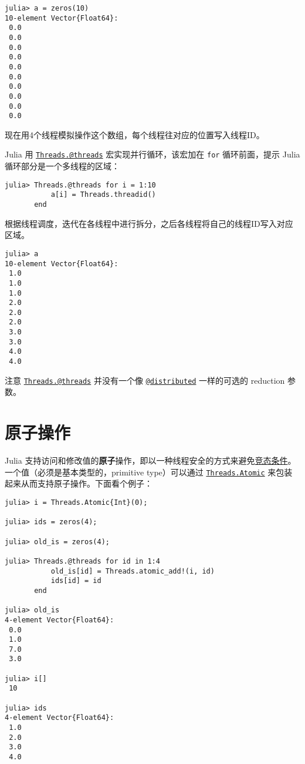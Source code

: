 \begin{verbatim}
julia> a = zeros(10)
10-element Vector{Float64}:
 0.0
 0.0
 0.0
 0.0
 0.0
 0.0
 0.0
 0.0
 0.0
 0.0
\end{verbatim}



现在用4个线程模拟操作这个数组，每个线程往对应的位置写入线程ID。



Julia 用 \hyperlink{15582842999596899869}{\texttt{Threads.@threads}} 宏实现并行循环，该宏加在 \texttt{for} 循环前面，提示 Julia 循环部分是一个多线程的区域：




\begin{verbatim}
julia> Threads.@threads for i = 1:10
           a[i] = Threads.threadid()
       end
\end{verbatim}



根据线程调度，迭代在各线程中进行拆分，之后各线程将自己的线程ID写入对应区域。




\begin{verbatim}
julia> a
10-element Vector{Float64}:
 1.0
 1.0
 1.0
 2.0
 2.0
 2.0
 3.0
 3.0
 4.0
 4.0
\end{verbatim}



注意 \hyperlink{15582842999596899869}{\texttt{Threads.@threads}} 并没有一个像 \hyperlink{4581929266257108937}{\texttt{@distributed}} 一样的可选的 reduction 参数。



\hypertarget{3709065031863484492}{}


\section{原子操作}



Julia 支持访问和修改值的\textbf{原子}操作，即以一种线程安全的方式来避免\href{https://en.wikipedia.org/wiki/Race\_condition}{竞态条件}。一个值（必须是基本类型的，primitive type）可以通过 \hyperlink{1140117372581270616}{\texttt{Threads.Atomic}} 来包装起来从而支持原子操作。下面看个例子：




\begin{verbatim}
julia> i = Threads.Atomic{Int}(0);

julia> ids = zeros(4);

julia> old_is = zeros(4);

julia> Threads.@threads for id in 1:4
           old_is[id] = Threads.atomic_add!(i, id)
           ids[id] = id
       end

julia> old_is
4-element Vector{Float64}:
 0.0
 1.0
 7.0
 3.0

julia> i[]
 10

julia> ids
4-element Vector{Float64}:
 1.0
 2.0
 3.0
 4.0
\end{verbatim}



